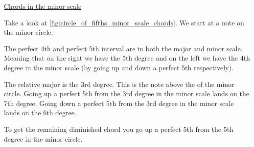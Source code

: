 \underline{Chords in the minor scale}

Take a look at \autoref{fig:circle_of_fifths_minor_scale_chords}. We start at a note on the minor circle.

The perfect 4th and perfect 5th interval are in both the major and minor scale. Meaning that on the right we have the 5th degree and on the left we have the 4th degree in the minor scale (by going up and down a perfect 5th respectively).

The relative major is the 3rd degree. This is the note above the  of the minor circle. Going up a perfect 5th from the 3rd degree in the minor scale lands on the 7th degree. Going down a perfect 5th from the 3rd degree in the minor scale lands on the 6th degree.

To get the remaining diminished chord you go up a perfect 5th from the 5th degree in the minor circle.

